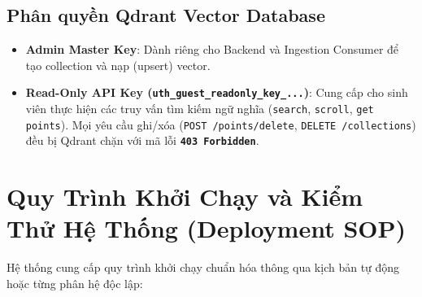 \subsection{Phân quyền Qdrant Vector Database}
\begin{itemize}
  \item \textbf{Admin Master Key}: Dành riêng cho Backend và Ingestion Consumer để tạo collection và nạp (upsert) vector.
  \item \textbf{Read-Only API Key (\texttt{uth\_guest\_readonly\_key\_...})}: Cung cấp cho sinh viên thực hiện các truy vấn tìm kiếm ngữ nghĩa (\texttt{search}, \texttt{scroll}, \texttt{get points}). Mọi yêu cầu ghi/xóa (\texttt{POST /points/delete}, \texttt{DELETE /collections}) đều bị Qdrant chặn với mã lỗi \textbf{\texttt{403 Forbidden}}.
\end{itemize}

\section{Quy Trình Khởi Chạy và Kiểm Thử Hệ Thống (Deployment SOP)}

Hệ thống cung cấp quy trình khởi chạy chuẩn hóa thông qua kịch bản tự động hoặc từng phân hệ độc lập:

